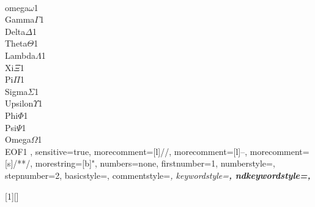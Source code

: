 {	{\\omega}{$\omega$}1
	{\\Gamma}{$\Gamma$}1
	{\\Delta}{$\Delta$}1
	{\\Theta}{$\Theta$}1
	{\\Lambda}{$\Lambda$}1
	{\\Xi}{$\Xi$}1
	{\\Pi}{$\Pi$}1
	{\\Sigma}{$\Sigma$}1
	{\\Upsilon}{$\Upsilon$}1
	{\\Phi}{$\Phi$}1
	{\\Psi}{$\Psi$}1
	{\\Omega}{$\Omega$}1
	{\\EOF}{\;}1
	,
	sensitive=true,  %
	morecomment=[l]//,%
	morecomment=[l]{--},%
	morecomment=[s]{/*}{*/},%
	morestring=[b]",
	numbers=none,
	firstnumber=1,
	numberstyle=\tiny,
	stepnumber=2,
	basicstyle=\scriptsize\ttfamily,
	commentstyle=\color[HTML]{00A108}\itshape,
	keywordstyle=\color[HTML]{2835C0}\bfseries,
	ndkeywordstyle=\bfseries,
}

\def\A{%
\lstinline[language=alloy,basicstyle=\ttfamily,columns=fixed]}

% paragraph
[1][]{%
	}{}

	\newcommand{\alloyfile}[1]{
		
	}


